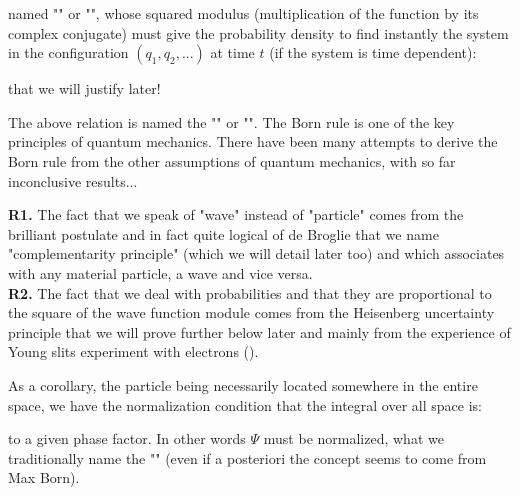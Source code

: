 	named "" or "", whose squared modulus (multiplication of the function by its complex conjugate) must give the probability density to find instantly the system in the configuration $(q_1,q_2,...)$ at time $t$ (if the system is time dependent):
	
	that we will justify later!
	
	The above relation is named the "" or "". The Born rule is one of the key principles of quantum mechanics. There have been many attempts to derive the Born rule from the other assumptions of quantum mechanics, with so far inconclusive results...
	
	\begin{tcolorbox}[title=Remarks,colframe=black,arc=10pt]
	\textbf{R1.} The fact that we speak of "wave" instead of "particle" comes from the brilliant postulate and in fact quite logical of de Broglie that we name "complementarity principle" (which we will detail later too) and which associates with any material particle, a wave and vice versa.\\
	
	\textbf{R2.} The fact that we deal with probabilities and that they are proportional to the square of the wave function module comes from the Heisenberg uncertainty principle that we will prove further below later and mainly from the experience of Young slits experiment with electrons ().
	\end{tcolorbox}
	As a corollary, the particle being necessarily located somewhere in the entire space, we have the normalization condition that the integral over all space is:
	
	to a given phase factor. In other words $\Psi$ must be normalized, what we traditionally name the "\label{de broglie normalization condition}" (even if a posteriori the concept seems to come from Max Born).
	
